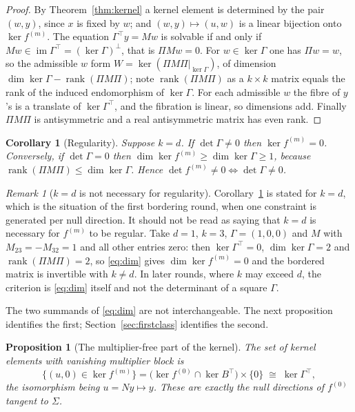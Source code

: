 \documentclass[12pt]{article}
\theoremstyle{plain}
\newtheorem{proposition}[theorem]{Proposition}
\newtheorem{corollary}[theorem]{Corollary}
\theoremstyle{definition}
\theoremstyle{remark}
\newtheorem{remark}[theorem]{Remark}
\DeclareMathOperator{\rank}{rank}
\DeclareMathOperator{\im}{im}
\begin{document}
	\begin{proof}
		By Theorem~\ref{thm:kernel} a kernel element is determined by the pair $(w,y)$,
		since $x$ is fixed by $w$; and $(w,y)\mapsto(u,w)$ is a linear bijection onto
		$\ker f^{(m)}$. The equation $\Gamma^{\top}y=Mw$ is solvable if and only if
		$Mw\in\im\Gamma^{\top}=(\ker\Gamma)^{\perp}$, that is $\Pi Mw=0$. For
		$w\in\ker\Gamma$ one has $\Pi w=w$, so the admissible $w$ form
		$W=\ker(\Pi M\Pi|_{\ker\Gamma})$, of dimension
		$\dim\ker\Gamma-\rank(\Pi M\Pi)$; note $\rank(\Pi M\Pi)$ as a $k\times k$ matrix
		equals the rank of the induced endomorphism of $\ker\Gamma$. For each admissible
		$w$ the fibre of $y$'s is a translate of $\ker\Gamma^{\top}$, and the fibration
		is linear, so dimensions add. Finally $\Pi M\Pi$ is antisymmetric and a real
		antisymmetric matrix has even rank.
	\end{proof}
	
	\begin{corollary}[Regularity]
		\label{cor:regularity}
		Suppose $k=d$. If $\det\Gamma\neq0$ then $\ker f^{(m)}=0$. Conversely, if
		$\det\Gamma=0$ then $\dim\ker f^{(m)}\geq\dim\ker\Gamma\geq1$, because
		$\rank(\Pi M\Pi)\leq\dim\ker\Gamma$. Hence
		$\det f^{(m)}\neq0\iff\det\Gamma\neq0$.
	\end{corollary}
	
	\begin{remark}[$k=d$ is not necessary for regularity]
		\label{rem:knotd}
		Corollary~\ref{cor:regularity} is stated for $k=d$, which is the situation of
		the first bordering round, when one constraint is generated per null direction.
		It should not be read as saying that $k=d$ is necessary for $f^{(m)}$ to be
		regular. Take $d=1$, $k=3$, $\Gamma=(1,0,0)$ and $M$ with $M_{23}=-M_{32}=1$ and
		all other entries zero: then $\ker\Gamma^{\top}=0$, $\dim\ker\Gamma=2$ and
		$\rank(\Pi M\Pi)=2$, so \eqref{eq:dim} gives $\dim\ker f^{(m)}=0$ and the
		bordered matrix is invertible with $k\neq d$. In later rounds, where $k$ may
		exceed $d$, the criterion is \eqref{eq:dim} itself and not the determinant of a
		square $\Gamma$.
	\end{remark}
	
	The two summands of \eqref{eq:dim} are not interchangeable. The next proposition
	identifies the first; Section~\ref{sec:firstclass} identifies the second.
	
	\begin{proposition}[The multiplier-free part of the kernel]
		\label{prop:mfree}
		The set of kernel elements with vanishing multiplier block is
		\begin{equation}
			\{(u,0)\in\ker f^{(m)}\}
			=\bigl(\ker f^{(0)}\cap\ker B^{\top}\bigr)\times\{0\}
			\;\cong\;\ker\Gamma^{\top},
			\label{eq:mfree}
		\end{equation}
		the isomorphism being $u=Ny\mapsto y$. These are exactly the null directions of
		$f^{(0)}$ tangent to $\Sigma$.
	\end{proposition}
	
\end{document}
